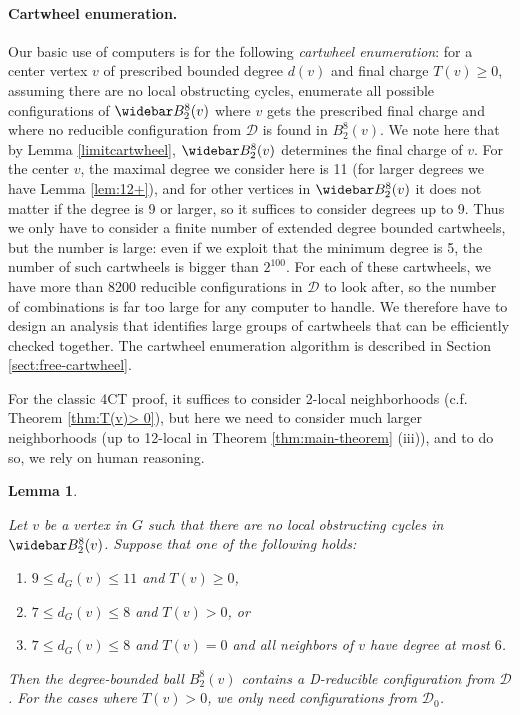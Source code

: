 \documentclass[10pt,a4paper]{article}
\newtheorem{lem}[thm]{Lemma}
\renewcommand{\bar}{\widebar}
\def\cD{{\mathcal D}}
\def\showlabel#1{}
\begin{document}
\paragraph{Cartwheel enumeration.}
Our basic use of computers is for the following \emph{cartwheel enumeration}: for a center vertex $v$ of prescribed bounded degree $d(v)$ and final charge $T(v)\geq 0$, assuming there are no local obstructing cycles, enumerate all possible configurations of $\bar B^8_2(v)$ where $v$ gets the prescribed final charge and where no reducible configuration from $\cD$ is found in $B_2^8(v)$. We note
here that by Lemma \ref{limitcartwheel}, $\bar B^8_2(v)$ determines the final charge of $v$.  For the center $v$, the maximal degree we consider here is 11 (for larger degrees we have Lemma \ref{lem:12+}), and for other vertices in $\bar B^8_2(v)$ it does not matter if the degree is 9 or larger, so it suffices to consider degrees up to 9. Thus we only have to consider a finite number of extended degree bounded cartwheels, but the number is large: even if
we exploit that the minimum degree is 5, the number of such cartwheels is bigger than $2^{100}$. For each of these cartwheels, we have more than 8200 reducible configurations in $\cD$ to look after, so the number of combinations is far too large for any computer to handle. We therefore have to design an analysis that identifies large groups of cartwheels that can be efficiently checked together. The
cartwheel enumeration algorithm is 
described in Section \ref{sect:free-cartwheel}.



For the classic 4CT proof, it suffices to consider 2-local neighborhoods (c.f. Theorem \ref{thm:T(v)> 0}), but here we need to consider much larger neighborhoods (up to 12-local in Theorem \ref{thm:main-theorem} (iii)), and to do so, we rely on human reasoning.


\begin{lem}
\label{lem:positive-comp}
\showlabel{lem:positive-comp}
    Let $v$ be a vertex in $G$ such that there are no local obstructing cycles in $\bar B_2^8(v)$. Suppose that one of the following holds:
    \begin{enumerate}
        \item $9 \leq d_G(v) \leq 11$ and $T(v) \geq 0$,
        \item $7 \leq d_G(v) \leq 8$ and $T(v) > 0$, or
        \item $7 \leq d_G(v) \leq 8$ and $T(v) = 0$ and all neighbors of $v$ have degree at most $6$.
    \end{enumerate}
    Then the degree-bounded ball $B_2^8(v)$
    contains a D-reducible configuration from $\mathcal{D}$. For the cases where $T(v)>0$, we
    only need configurations from $\cD_0$.
\end{lem}
\end{document}
